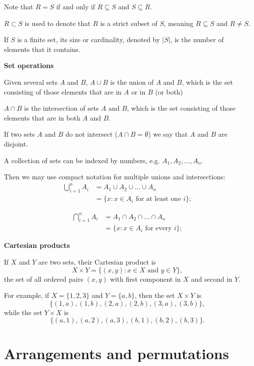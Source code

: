 \documentclass[10pt, a4paper]{article}
\begin{document}
Note that $R = S$ if and only if $R \subseteq S$ and $S \subseteq R$.

$R \subset S$ is used to denote that $R$ is a strict subset of $S$, meaning $R \subseteq S$ and $R \neq S$.

If $S$ is a finite set, its size or cardinality, denoted by $|S|$, is the number of elements that it contains.


\textbf{Set operations}

Given several sets $A$ and $B$, $A \cup B$ is the union of $A$ and $B$, which is the set consisting of those elements that are in $A$ or in $B$ (or both)

$A \cap B$ is the intersection of sets $A$ and $B$, which is the set consisting of those elements that are in both $A$ and $B$.

If two sets $A$ and $B$ do not intersect ($A \cap B = \emptyset$) we say that $A$ and $B$ are disjoint.

A collection of sets can be indexed by numbers, e.g. $A_1, A_2, \dots, A_n$.

Then we may use compact notation for multiple unions and intersections:
\begin{align*}
    \bigcup_{i = 1}^{n}{A_i} &= A_1 \cup A_2 \cup \dots \cup A_n \\
    &= \{x: x \in A_i \text{ for at least one } i\};
\end{align*}

\begin{align*}
    \bigcap_{i = 1}^{n}{A_i} &= A_1 \cap A_2 \cap \dots \cap A_n \\
    &= \{x: x \in A_i \text{ for every } i\};
\end{align*}

\textbf{Cartesian products}

If $X$ and $Y$ are two sets, their Cartesian product is
\[
X \times Y = \{(x, y): x \in X \text{ and } y \in Y\},
\]
the set of all ordered pairs $(x, y)$ with first component in $X$ and second in $Y$.

For example, if $X = \{1, 2, 3\}$ and $Y = \{a, b\}$, then the set $X \times Y$ is
\[
\{(1, a), (1, b), (2, a), (2, b), (3, a), (3, b)\},
\]
while the set $Y \times X$ is
\[
\{(a, 1), (a, 2), (a, 3), (b, 1), (b, 2), (b, 3)\}.
\]

\section{Arrangements and permutations}
\end{document}
